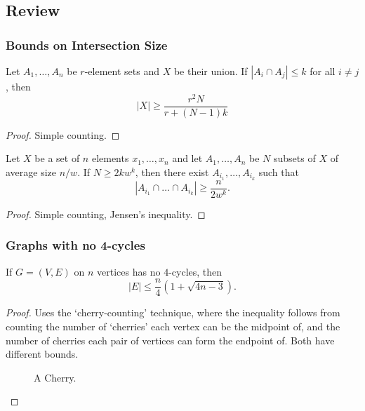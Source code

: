\subsection{Review}

\subsubsection{Bounds on Intersection Size}

\begin{theorem}
	Let $A_1,\dots,A_n$ be $r$-element sets and $X$ be their union. If $|A_i\cap A_j|\leq k$ for all $i\neq j$, then
	$$|X|\geq\frac{r^2N}{r+(N-1)k}$$
\end{theorem}

\begin{proof}
	Simple counting.
\end{proof}

\begin{theorem}[Erd\"os 1964]
	Let $X$ be a set of $n$ elements $x_1,\dots, x_n$ and let $A_1,\dots, A_n$ be $N$ subsets of $X$ of average size $n/w$. If $N\geq 2kw^k$, then there exist $A_{i_1},\dots,A_{i_k}$ such that
	$$|A_{i_1}\cap\dots\cap A_{i_k}|\geq \frac{n}{2w^k}.$$
\end{theorem}

\begin{proof}
	Simple counting, Jensen's inequality.
\end{proof}

\subsubsection{Graphs with no 4-cycles}

\begin{theorem}[Reiman 1958]
	If $G=(V,E)$ on $n$ vertices has no $4$-cycles, then
	$$|E|\leq \frac{n}{4}(1+\sqrt{4n-3}).$$
\end{theorem}
\begin{proof}
	Uses the `cherry-counting' technique, where the inequality follows from counting the number of `cherries' each vertex can be the midpoint of, and the number of cherries each pair of vertices can form the endpoint of. Both have different bounds.
	
	\begin{figure}[h]
		\centering
		\caption{A Cherry.}
	\end{figure}
\end{proof}


